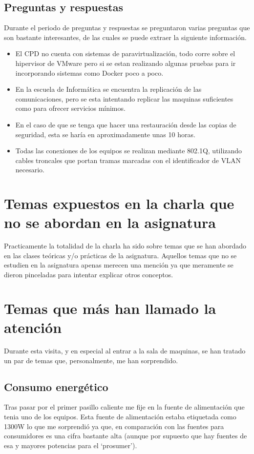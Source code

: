 \documentclass[a4paper,11pt]{article}
\begin{document}
\subsection{Preguntas y respuestas}
Durante el periodo de preguntas y respuestas se preguntaron varias preguntas que son bastante interesantes, de las cuales se puede extraer la siguiente información.\\

 \begin{itemize}
   \item El CPD no cuenta con sistemas de paravirtualización, todo corre sobre el hipervisor de VMware pero si se estan realizando algunas pruebas para ir incorporando sistemas como Docker poco a poco.
   \item En la escuela de Informática se encuentra la replicación de las comunicaciones, pero se esta intentando replicar las maquinas suficientes como para ofrecer servicios mínimos.
   \item En el caso de que se tenga que hacer una restauración desde las copias de seguridad, esta se haría en aproximadamente unas 10 horas.
   \item Todas las conexiones de los equipos se realizan mediante 802.1Q, utilizando cables troncales que portan tramas marcadas con el identificador de VLAN necesario.
 \end{itemize}



\section{Temas expuestos en la charla que no se abordan en la asignatura}
Practicamente la totalidad de la charla ha sido sobre temas que se han abordado en las clases teóricas y/o prácticas de la asignatura. Aquellos temas que no se estudien en la asignatura apenas merecen una mención ya que meramente se dieron pinceladas para intentar explicar otros conceptos.

\section{Temas que más han llamado la atención}
Durante esta visita, y en especial al entrar a la sala de maquinas, se han tratado un par de temas que, personalmente, me han sorprendido.
\subsection{Consumo energético}
Tras pasar por el primer pasillo caliente me fije en la fuente de alimentación que tenia uno de los equipos. Esta fuente de alimentación estaba etiquetada como 1300W lo que me sorprendió ya que, en comparación con las fuentes para consumidores es una cifra bastante alta (aunque por supuesto que hay fuentes de esa y mayores potencias para el `prosumer').\\
\end{document}
